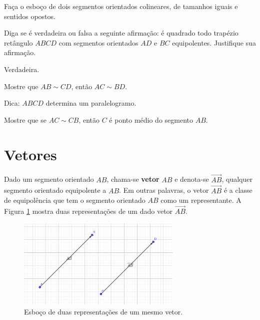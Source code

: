\begin{exer}
  Faça o esboço de dois segmentos orientados colineares, de tamanhos iguais e sentidos opostos.
\end{exer}

\begin{exer}
  Diga se é verdadeira ou falsa a seguinte afirmação: é quadrado todo trapézio retângulo $ABCD$ com segmentos orientados $AD$ e $BC$ equipolentes. Justifique sua afirmação. 
\end{exer}
\begin{resp}
  Verdadeira.
\end{resp}

\begin{exer}
  Mostre que $AB\sim CD$, então $AC\sim BD$.
\end{exer}
\begin{resp}
  Dica: $ABCD$ determina um paralelogramo.
\end{resp}

\begin{exer}
  Mostre que se $AC\sim CB$, então $C$ é ponto médio do segmento $AB$.
\end{exer}

\section{Vetores}\label{cap_vetor_sec_vetor}

Dado um segmento orientado $AB$, chama-se {\bf vetor} $AB$ e denota-se $\overrightarrow{AB}$, qualquer segmento orientado equipolente a $AB$. Em outras palavras, o vetor $\overrightarrow{AB}$ é a classe de equipolência que tem o segmento orientado $AB$ como um representante. A Figura \ref{fig:vetor} mostra duas representações de um dado vetor $\overrightarrow{AB}$.

\begin{figure}[h!]
  \centering
  \includegraphics[width=0.7\textwidth]{./cap_vetor/dados/fig_vetor/fig_vetor}
  \caption{Esboço de duas representações de um mesmo vetor.}
  \label{fig:vetor}
\end{figure}

